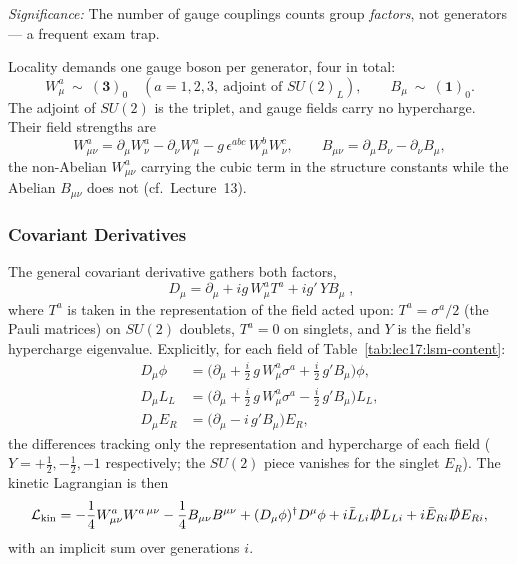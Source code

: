 \textit{Significance:} The number of gauge couplings counts group \emph{factors}, not generators --- a frequent exam trap.

Locality demands one gauge boson per generator, four in total:
\begin{equation}
  W_\mu^a\ \sim\ (\mathbf{3})_0\quad(a=1,2,3,\ \text{adjoint of }SU(2)_L),
  \qquad
  B_\mu\ \sim\ (\mathbf{1})_0 .
  \label{eq:lec17:gauge_bosons}
\end{equation}
The adjoint of $SU(2)$ is the triplet, and gauge fields carry no hypercharge. Their field strengths are
\begin{equation}
  \boxed{\;
  W^a_{\mu\nu}=\partial_\mu W^a_\nu-\partial_\nu W^a_\mu
  -g\,\epsilon^{abc}\,W^b_\mu W^c_\nu ,
  \qquad
  B_{\mu\nu}=\partial_\mu B_\nu-\partial_\nu B_\mu ,
  \;}
  \label{eq:lec17:field_strengths}
\end{equation}
the non-Abelian $W^a_{\mu\nu}$ carrying the cubic term in the structure constants while the Abelian $B_{\mu\nu}$ does not (cf.\ Lecture~13).

\subsubsection*{Covariant Derivatives}

The general covariant derivative gathers both factors,
\begin{equation}
  \boxed{\;D_\mu=\partial_\mu+i g\,W^a_\mu T^a+i g'\,Y B_\mu\; ,}
  \label{eq:lec17:covariant_derivative}
\end{equation}
where $T^a$ is taken in the representation of the field acted upon: $T^a=\sigma^a/2$ (the Pauli matrices) on $SU(2)$ doublets, $T^a=0$ on singlets, and $Y$ is the field's hypercharge eigenvalue. Explicitly, for each field of Table~\ref{tab:lec17:lsm-content}:
\begin{align}
  D_\mu\phi&=\Big(\partial_\mu+\frac{i}{2}\,g\,W^a_\mu\sigma^a+\frac{i}{2}\,g'B_\mu\Big)\phi ,
  \label{eq:lec17:Dphi}\\[2pt]
  D_\mu L_{L}&=\Big(\partial_\mu+\frac{i}{2}\,g\,W^a_\mu\sigma^a-\frac{i}{2}\,g'B_\mu\Big)L_{L} ,
  \label{eq:lec17:DL}\\[2pt]
  D_\mu E_{R}&=\Big(\partial_\mu-i\,g'B_\mu\Big)E_{R} ,
  \label{eq:lec17:DE}
\end{align}
the differences tracking only the representation and hypercharge of each field ($Y=+\tfrac12,-\tfrac12,-1$ respectively; the $SU(2)$ piece vanishes for the singlet $E_R$). The kinetic Lagrangian is then
\begin{equation}
  \mathcal{L}_{\rm kin}
  =-\frac14 W^a_{\mu\nu}W^{a\,\mu\nu}-\frac14 B_{\mu\nu}B^{\mu\nu}
  +(D_\mu\phi)^\dagger D^\mu\phi
  +i\bar L_{Li}\slashed{D}L_{Li}
  +i\bar E_{Ri}\slashed{D}E_{Ri} ,
  \label{eq:lec17:kinetic_lagrangian}
\end{equation}
with an implicit sum over generations $i$.

